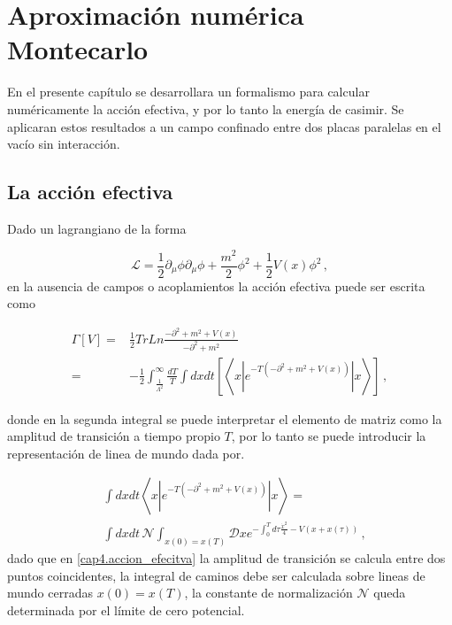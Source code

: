 \chapter{Aproximación numérica Montecarlo}{\label{cap.montecarlo}}

En el presente capítulo se desarrollara un formalismo para calcular numéricamente la acción efectiva, y por lo tanto la energía de casimir.
Se aplicaran estos resultados a un campo confinado entre dos placas paralelas en el vacío sin interacción.

\section{La acción efectiva}



Dado un lagrangiano de la forma


\begin{equation}
\mathscr{L} = \frac{1}{2} \partial _{\mu} \phi  \partial _{\mu} \phi +
	\frac{m^2}{2} \phi ^2  + \frac{1}{2} V(x) \phi ^2
	\, ,
\end{equation}
en la ausencia de campos o acoplamientos la acción efectiva puede ser escrita como


\begin{align}
\Gamma \left[ V \right] =&
  \frac{1}{2} Tr Ln \frac{- \partial ^2 + m ^2 + V(x)}{- \partial ^2 + m ^2} \\ 
 =& - \frac{1}{2} \int _{\frac{1}{\Lambda ^2}} ^{\infty} \frac{dT}{T} \int dx dt \left[ \left< x | e ^{-T (- \partial ^2 + m ^2 + V(x))} | x  \right> \right] \, ,
\label{cap4.accion_efecitva}
\end{align}


%

donde en la segunda integral se puede interpretar el elemento de matriz como la amplitud de transición a tiempo propio $T$, por lo tanto se puede introducir la representación de linea de mundo dada por.


\begin{align}
& \int dx  dt \left< x | e ^{-T (- \partial ^2 + m ^2 + V(x))} | x  \right> = \\
& \int dx  dt \, 
\mathcal{N}  \int _{x(0) = x(T)} \mathscr D x e ^{- \int _0 ^T d \tau  \frac{\dot{x} ^2}{4} - V(x + x( \tau )) }
\nonumber
\, ,
\label{eq.definicion_ensamble}
\end{align}
dado que en \eqref{cap4.accion_efecitva} la amplitud de transición se calcula entre dos puntos coincidentes, la integral de caminos debe ser calculada sobre lineas de mundo cerradas $x(0) = x(T)$, la constante de normalización $\mathcal{N}$ queda determinada por el límite de cero potencial.


